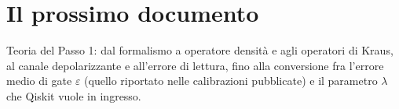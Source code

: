 \documentclass[11pt,a4paper]{article}
\begin{document}
\section{Il prossimo documento}
\label{sec:prossimo}

Teoria del Passo 1: dal formalismo a operatore densità e agli operatori di Kraus, al
canale depolarizzante e all'errore di lettura, fino alla conversione fra l'errore medio
di gate $\varepsilon$ (quello riportato nelle calibrazioni pubblicate) e il parametro
$\lambda$ che Qiskit vuole in ingresso.
\end{document}
